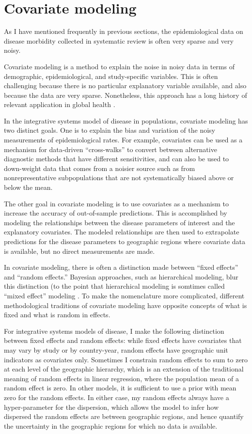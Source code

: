 \chapter{Covariate modeling}
\label{theory-covariate_modeling}
As I have mentioned frequently in previous sections, the
epidemiological data on disease morbidity collected in systematic
review is often very sparse and very noisy.

Covariate modeling is a method to explain the noise in noisy
data in terms of demographic, epidemiological, and study-specific
variables.  This is often challenging because there is no particular
explanatory variable available, and also because the data are very
sparse.  Nonetheless, this approach has a long history of relevant
application in global health \cite{girosi_demographic_2008,jon_wakefield_bayesian_1996}.

In the integrative systems model of disease in populations, covariate
modeling has two distinct goals.  One is to
explain the bias and variation of the noisy measurements of
epidemiological rates.  For example, covariates can be used as a mechanism
for data-driven ``cross-walks'' to convert between alternative diagnostic methods
that have different sensitivities, and can also be used to 
down-weight data that comes from a noisier source such as
from nonrepresentative subpopulations that are not systematically
biased above or below the mean.

The other goal in covariate modeling is to use covariates as a
mechanism to increase the accuracy of out-of-sample predictions.  This
is accomplished by modeling the relationships between the disease
parameters of interest and the explanatory covariates. The modeled
relationships are then used to extrapolate predictions for the disease
parameters to geographic regions where covariate data is available,
but no direct measurements are made.

In covariate modeling, there is often a distinction made between
``fixed effects'' and ``random effects.''  Bayesian approaches, such
as hierarchical modeling, blur this distinction (to the point that
hierarchical modeling is somtimes called ``mixed effect'' modeling
\cite{Gelman_Multilevel_2005}.  To make the nomenclature more
complicated, different methodological traditions of covariate modeling
have opposite concepts of what is fixed and what is random in effects.

For integrative systems models of disease, I make the following
distinction between fixed effects and random effects: while fixed
effects have covariates that may vary by study or by country-year,
random effects have geographic unit indicators as covariates only.
Sometimes I constrain random effects to sum to zero at each level of
the geographic hierarchy, which is an extension of the traditional
meaning of random effects in linear regression, where the population
mean of a random effect is zero.  In other models, it is sufficient to
use a prior with mean zero for the random effects.  In either case,
my random effects always have a hyper-parameter for the dispersion,
which allows the model to infer how dispersed the random effects are
between geographic regions, and hence quantify the uncertainty in the
geographic regions for which no data is available.

